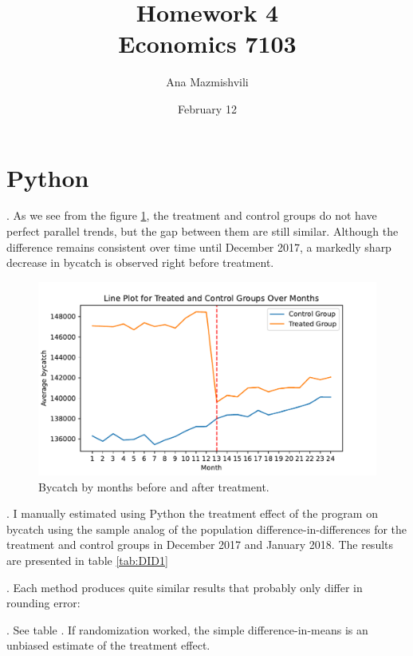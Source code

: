 \documentclass{article}
\title{Homework 4 \\ Economics 7103}
\author{Ana Mazmishvili}
\date{February 12}
\begin{document}
  
\maketitle

\section{Python}

. As we see from the figure \ref{fig:trend}, the treatment and control groups do not have perfect parallel trends, but the gap between them are still similar. Although the difference remains consistent over time until December 2017, a markedly sharp decrease in bycatch is observed right before treatment.

\begin{figure}[h]
    \centering
    \includegraphics{homework 4/output/figure/trend1.pdf}
    \caption{ Bycatch by months before and after treatment. }
    \label{fig:trend}
\end{figure}

\FloatBarrier

. I manually estimated using Python the treatment effect of the program on bycatch using the sample analog of the population difference-in-differences for the treatment and control groups in December 2017 and January 2018. The results are presented in table \ref{tab:DID1}



\FloatBarrier

. Each method produces quite similar results that probably only differ in rounding error:


. See table .  If randomization worked, the simple difference-in-means is an unbiased estimate of the treatment effect.
\end{document}
